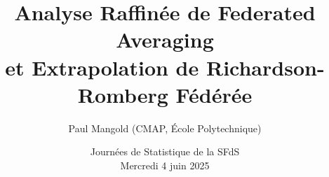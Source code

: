 \documentclass[aspectratio=169,12pt]{beamer}
\title{\Large Analyse Raffinée de Federated Averaging \\ \Large  et Extrapolation de Richardson-Romberg Fédérée }
\subtitle{}
\author{
  Paul Mangold (CMAP, École Polytechnique)
}
\institute{}
\date{Journées de Statistique de la SFdS \\[0.5em] Mercredi 4 juin 2025}
\def\setupappendix{
\setcounter{framenumber}{0}
\setbeamertemplate{footline}
{
  \hbox{\begin{beamercolorbox}[wd=1\paperwidth,ht=5.25ex,dp=4ex,right]{framenumber}%
      \large A-\insertframenumber{}~~
    \end{beamercolorbox}}%
  \vskip0pt%
}
}
\begin{document}
\begin{frame}[plain]
  \maketitle
\end{frame}












\end{document}
